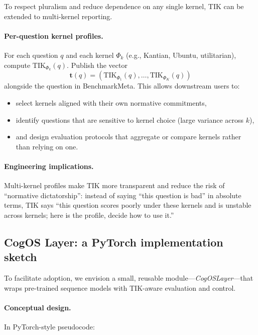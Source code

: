 \documentclass[11pt]{article}
\newcommand{\TIK}{\text{TIK}}
\begin{document}
To respect pluralism and reduce dependence on any single kernel, TIK can be extended to multi-kernel reporting.

\paragraph{Per-question kernel profiles.} For each question $q$ and each kernel $\Phi_k$ (e.g., Kantian, Ubuntu, utilitarian), compute $\TIK_{\Phi_k}(q)$. Publish the vector
\[
\mathbf{t}(q) = \left( \TIK_{\Phi_1}(q), \ldots, \TIK_{\Phi_K}(q) \right)
\]
alongside the question in BenchmarkMeta. This allows downstream users to:
\begin{itemize}
    \item select kernels aligned with their own normative commitments,
    \item identify questions that are sensitive to kernel choice (large variance across $k$),
    \item and design evaluation protocols that aggregate or compare kernels rather than relying on one.
\end{itemize}

\paragraph{Engineering implications.} Multi-kernel profiles make TIK more transparent and reduce the risk of “normative dictatorship”: instead of saying “this question is bad” in absolute terms, TIK says “this question scores poorly under these kernels and is unstable across kernels; here is the profile, decide how to use it.”

\subsection{CogOS Layer: a PyTorch implementation sketch}

To facilitate adoption, we envision a small, reusable module—\emph{CogOSLayer}—that wraps pre-trained sequence models with TIK-aware evaluation and control.

\paragraph{Conceptual design.} In PyTorch-style pseudocode:

\end{document}
